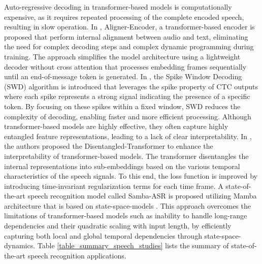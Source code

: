 \documentclass[preprint,12pt]{elsarticle}
\begin{document}
Auto-regressive decoding in transformer-based models is computationally expensive, as it requires repeated processing of the complete encoded speech, resulting in slow operation. In \citep{stooke_aligner-encoders_2025}, Aligner-Encoder, a transformer-based encoder is proposed that perform internal alignment between audio and text, eliminating the need for complex decoding steps and complex dynamic programming during training. The approach simplifies the model architecture using a lightweight decoder without cross attention that processes embedding frames sequentially until an end-of-message token is generated. In \citep{zhang_breaking_2025}, the Spike Window Decoding (SWD) algorithm is introduced that leverages the spike property of CTC outputs where each spike represents a strong signal indicating the presence of a specific token. By focusing on these spikes within a fixed window, SWD reduces the complexity of decoding, enabling faster and more efficient processing. Although transformer-based models are highly effective, they often capture highly entangled feature representations, leading to a lack of clear interpretability. In \citep{wang_disentangled-transformer_2024}, the authors proposed the Disentangled-Transformer to enhance the interpretability of transformer-based models. The transformer disentangles the internal representations into sub-embeddings based on the various temporal characteristics of the speech signals. To this end, the loss function is improved by introducing time-invariant regularization terms for each time frame. A state-of-the-art speech recognition model called Samba-ASR is proposed utilizing Mamba architecture that is based on state-space-models \citep{shakhadri_samba-asr_2025}. This approach overcomes the limitations of transformer-based models such as inability to handle long-range dependencies and their quadratic scaling with input length, by efficiently capturing both local and global temporal dependencies through state-space-dynamics. Table \ref{table_summary_speech_studies} lists the summary of state-of-the-art speech recognition applications.
\end{document}
